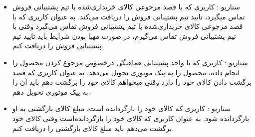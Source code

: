 \documentclass[14pt]{article}
\begin{document}
\begin{flushright}
\begin{itemize}
\item سناریو : کاربری که با قصد مرجوعی کالای خریداری‌شده با تیم پشتیبانی فروش تماس میگیرد، تایید تیم پشتیبانی فروش را دریافت می‌کند.
\newline
به عنوان کاربری که با قصد مرجوعی کالای خریداری‌شده با تیم پشتیبانی فروش تماس می‌گیرد
\newline
وقتی با تیم پشتیبانی فروش تماس می‌گیرم، در صورت مهیا بودن شرایط
\newline
باید تایید تیم پشتیبانی فروش را دریافت کنم.

\item سناریو : کاربری که با واحد پشتیبانی هماهنگی درخصوص مرجوع کردن محصول را انجام داده، محصول را به پیک موتوری تحویل می‌دهد.
\newline
به عنوان کاربری که قصد برگشت دادن کالای خود را دارد
\newline
وقتی میخواهم کالای خود را برگشت دهم
\newline
باید آن را به پیک موتوری تحویل دهم.

\item سناریو : کاربری که کالای خود را بازگردانده است، مبلغ کالای بازگشتی به او بازگردانده شود.
\newline
به عنوان کاربری که کالای خود را بازگردانده‌است
\newline
وقتی کالای خود برگشت می‌دهم
\newline
باید مبلغ کالای بازگشتی را دریافت کنم.



\end{itemize}
\end{flushright}
\end{document}
